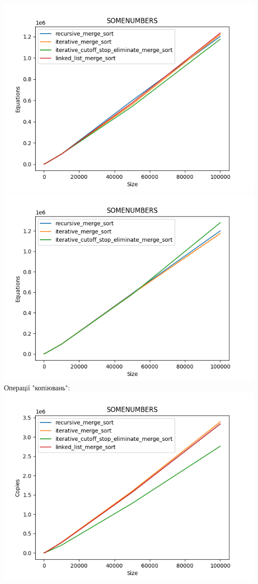 \documentclass{article}
\begin{document}
        \includegraphics[scale=0.5]{somenumbers_Equations_4_sorts_6_numbers_50_100to100000.png}
        \includegraphics[scale=0.5]{somenumbers_Equations_3_sorts_6_numbers_50_100to100000.png}
    \newpage
    Операцiї "копiювань":
    \newline
        \includegraphics[scale=0.5]{somenumbers_Copies_4_sorts_6_numbers_50_100to100000.png}
\end{document}
